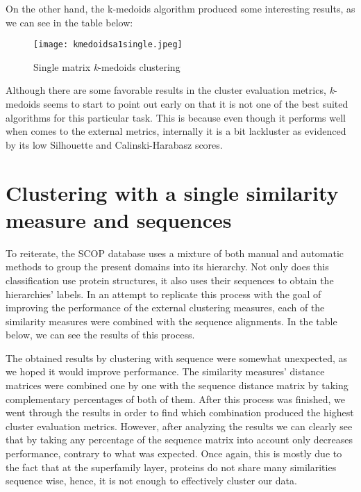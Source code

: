 On the other hand, the k-medoids algorithm produced some interesting results, as we can see in the table below:

\begin{figure}[htbp]
	\centering
	\texttt{[image: kmedoidsa1single.jpeg]}
	\caption{Single matrix \textit{k}-medoids clustering}
	\label{}
\end{figure}

Although there are some favorable results in the cluster evaluation metrics, \textit{k}-medoids seems to start to point out early on that it is not one of the best suited algorithms for this particular task. This is because even though it performs well when comes to the external metrics, internally it is a bit lackluster as evidenced by its low Silhouette and Calinski-Harabasz scores.



\section{Clustering with a single similarity measure and sequences}

To reiterate, the SCOP database uses a mixture of both manual and automatic methods to group the present domains into its hierarchy. Not only does this classification use protein structures, it also uses their sequences to obtain the hierarchies' labels. In an attempt to replicate this process with the goal of improving the performance of the external clustering measures, each of the similarity measures were combined with the sequence alignments. In the table below, we can see the results of this process.

The obtained results by clustering with sequence were somewhat unexpected, as we hoped it would improve performance. The similarity measures' distance matrices were combined one by one with the sequence distance matrix by taking complementary percentages of both of them. After this process was finished, we went through the results in order to find which combination produced the highest cluster evaluation metrics. However, after analyzing the results we can clearly see that by taking any percentage of the sequence matrix into account only decreases performance, contrary to what was expected. Once again, this is mostly due to the fact that at the superfamily layer, proteins do not share many similarities sequence wise, hence, it is not enough to effectively cluster our data.

